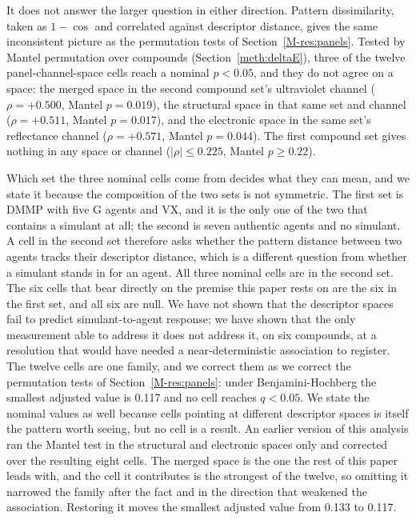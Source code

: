 \documentclass[journal=jacsat,manuscript=suppinfo,margin=1in]{achemso}
\begin{document}
It does not answer the larger question in either direction. Pattern
dissimilarity, taken as $1 - \cos$ and correlated against descriptor distance,
gives the same inconsistent picture as the permutation tests of
Section~\ref{M-res:panels}. Tested by Mantel permutation over compounds
(Section~\ref{meth:deltaE}), three of the twelve panel-channel-space cells reach a
nominal $p<0.05$, and they do not agree on a space: the merged space in the
second compound set's ultraviolet channel ($\rho = +0.500$, Mantel $p = 0.019$),
the structural space in that same set and channel ($\rho = +0.511$, Mantel
$p = 0.017$),
and the electronic space in the same set's reflectance channel ($\rho = +0.571$,
Mantel $p = 0.044$). The first compound set gives nothing in any space or
channel ($|\rho| \le 0.225$, Mantel $p \ge 0.22$).

Which set the three nominal cells come from decides what they can mean, and we
state it because the composition of the two sets is not symmetric. The first set
is DMMP with five G agents and VX, and it is the only one of the two that
contains a simulant at all; the second is seven authentic agents and no
simulant. A cell in the second set therefore asks whether the pattern distance
between two agents tracks their descriptor distance, which is a different
question from whether a simulant stands in for an agent. All three nominal cells
are in the second set. The six cells that bear directly on the premise this
paper rests on are the six in the first set, and all six are null. We have not
shown that the descriptor spaces fail to predict simulant-to-agent response; we
have shown that the only measurement able to address it does not address it, on
six compounds, at a resolution that would have needed a near-deterministic
association to register. The twelve cells are one
family, and we correct them as we correct the permutation tests of
Section~\ref{M-res:panels}: under Benjamini-Hochberg the smallest adjusted value is
0.117 and no cell reaches $q<0.05$. We state the nominal values as well because
cells pointing at different descriptor spaces is itself the pattern worth
seeing, but no cell is a result. An earlier version of this analysis ran the
Mantel test in the structural and electronic spaces only and corrected over the
resulting eight cells. The merged space is the one the rest of this paper leads
with, and the cell it contributes is the strongest of the twelve, so omitting it
narrowed the family after the fact and in the direction that weakened the
association. Restoring it moves the smallest adjusted value from 0.133 to
0.117.
\end{document}
